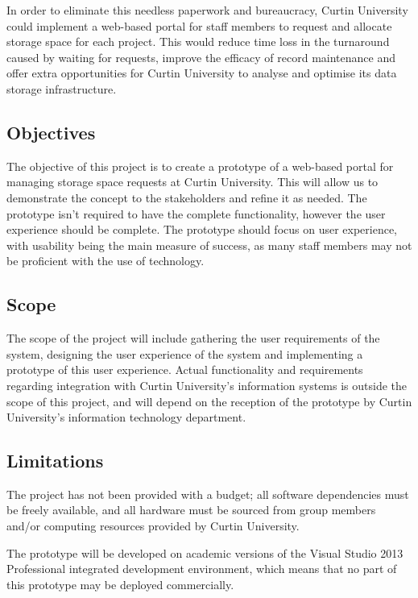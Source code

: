 \documentclass[a4paper,titlepage,12pt]{article}
\begin{document}
In order to eliminate this needless paperwork and bureaucracy, Curtin
University could implement a web-based portal for staff members to request and
allocate storage space for each project. This would reduce time loss in the
turnaround caused by waiting for requests, improve the efficacy of record
maintenance and offer extra opportunities for Curtin University to analyse and
optimise its data storage infrastructure.

\subsection{Objectives}

The objective of this project is to create a prototype of a web-based portal
for managing storage space requests at Curtin University. This will allow us to
demonstrate the concept to the stakeholders and refine it as needed. The
prototype isn't required to have the complete functionality, however the user
experience should be complete. The prototype should focus on user experience,
with usability being the main measure of success, as many staff members may not
be proficient with the use of technology.

\subsection{Scope}

The scope of the project will include gathering the user requirements of the
system, designing the user experience of the system and implementing a
prototype of this user experience. Actual functionality and requirements
regarding integration with Curtin University's information systems is outside
the scope of this project, and will depend on the reception of the prototype by
Curtin University's information technology department.

\newpage

\subsection{Limitations}

The project has not been provided with a budget; all software dependencies must
be freely available, and all hardware must be sourced from group members and/or
computing resources provided by Curtin University.

The prototype will be developed on academic versions of the Visual Studio 2013
Professional integrated development environment, which means that no part of
this prototype may be deployed commercially.
\end{document}

